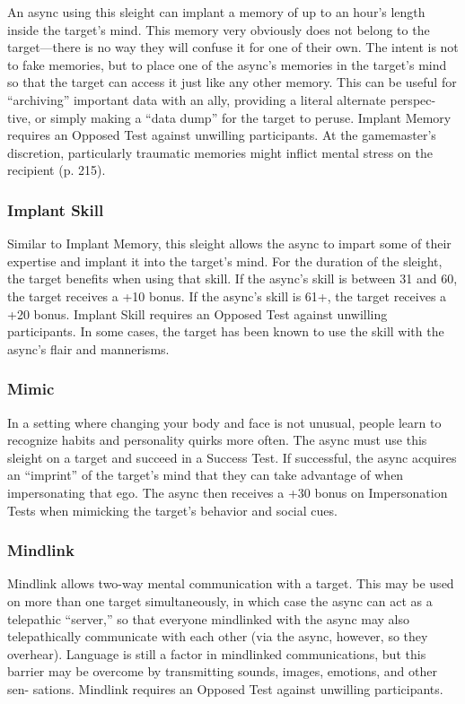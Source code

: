 An async using this sleight can implant a memory 
of up to an hour's length inside the target's mind. 
This memory very obviously does not belong to the 
target—there is no way they will confuse it for one 
of their own. The intent is not to fake memories, but 
to place one of the async's memories in the target's 
mind so that the target can access it just like any other 
memory. This can be useful for ``archiving'' important 
data with an ally, providing a literal alternate perspec-
tive, or simply making a ``data dump'' for the target 
to peruse. Implant Memory requires an Opposed Test 
against unwilling participants. At the gamemaster's 
discretion, particularly traumatic memories might 
inflict mental stress on the recipient (p. 215).

\subsubsection{Implant Skill}

Similar to Implant Memory, this sleight allows the 
async to impart some of their expertise and implant it 
into the target's mind. For the duration of the sleight, 
the target benefits when using that skill. If the async's 
skill is between 31 and 60, the target receives a +10 
bonus. If the async's skill is 61+, the target receives 
a +20 bonus. Implant Skill requires an Opposed Test 
against unwilling participants. In some cases, the 
target has been known to use the skill with the async's 
flair and mannerisms.

\subsubsection{Mimic}

In a setting where changing your body and face is 
not unusual, people learn to recognize habits and 
personality quirks more often. The async must use 
this sleight on a target and succeed in a Success Test. 
If successful, the async acquires an ``imprint'' of the 
target's mind that they can take advantage of when 
impersonating that ego. The async then receives a +30 
bonus on Impersonation Tests when mimicking the 
target's behavior and social cues.

\subsubsection{Mindlink}

Mindlink allows two-way mental communication 
with a target. This may be used on more than one 
target simultaneously, in which case the async can act 
as a telepathic ``server,'' so that everyone mindlinked 
with the async may also telepathically communicate 
with each other (via the async, however, so they 
overhear). Language is still a factor in mindlinked 
communications, but this barrier may be overcome by 
transmitting sounds, images, emotions, and other sen-
sations. Mindlink requires an Opposed Test against 
unwilling participants.

